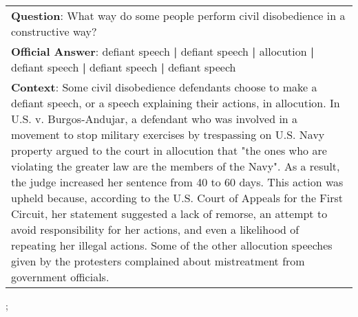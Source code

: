 \begin{figure*}[ht]
{\begin{tabular}{p{}}
            \textbf{Question}: What way do some people perform civil disobedience in a constructive way?                                                                                                                                                                                                                                                                                                                                                                                                                                                                                                                                                                                                                                                                                                                                                    \\
            \textbf{Official Answer}: defiant speech \textbf{|} defiant speech \textbf{|} allocution \textbf{|} defiant speech \textbf{|} defiant speech \textbf{|} defiant speech                                                                                                                                                                                                                                                                                                                                                                                                                                                                                                                                                                                                                                                                          \\
            \textbf{Context}: Some civil disobedience defendants choose to make a defiant speech, or a speech explaining their actions, in allocution. In U.S. v. Burgos-Andujar, a defendant who was involved in a movement to stop military exercises by trespassing on U.S. Navy property argued to the court in allocution that "the ones who are violating the greater law are the members of the Navy". As a result, the judge increased her sentence from 40 to 60 days. This action was upheld because, according to the U.S. Court of Appeals for the First Circuit, her statement suggested a lack of remorse, an attempt to avoid responsibility for her actions, and even a likelihood of repeating her illegal actions. Some of the other allocution speeches given by the protesters complained about mistreatment from government officials. \\
        \end{tabular}
    };
    \label{fig:ex-5728f50baf94a219006a9e55}
\end{figure*}

